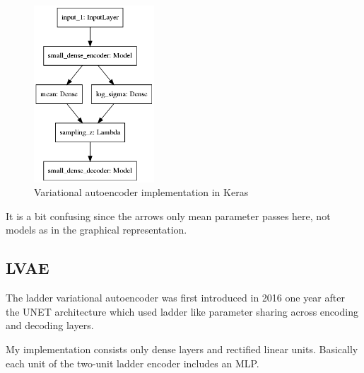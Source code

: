 \documentclass[11pt, english]{article}
\begin{document}
\vspace{3mm}

\begin{figure}[H]
    \centering
    \includegraphics[width=0.4\textwidth]{vae_keras.png}
    \caption{Variational autoencoder implementation in Keras}
\end{figure}

\vspace{3mm}

\par It is a bit confusing since the arrows only mean parameter passes here, not models as in the graphical representation.

\subsection{LVAE}

\par The ladder variational autoencoder was first introduced in 2016 \cite{sonderby2016ladder} one year after the UNET \cite{ronneberger2015u} architecture which used ladder like parameter sharing across encoding and decoding layers.

\vspace{3mm}

\par My implementation consists only dense layers and rectified linear units. Basically each unit of the two-unit ladder encoder includes an MLP. 

\vspace{3mm}
\end{document}
